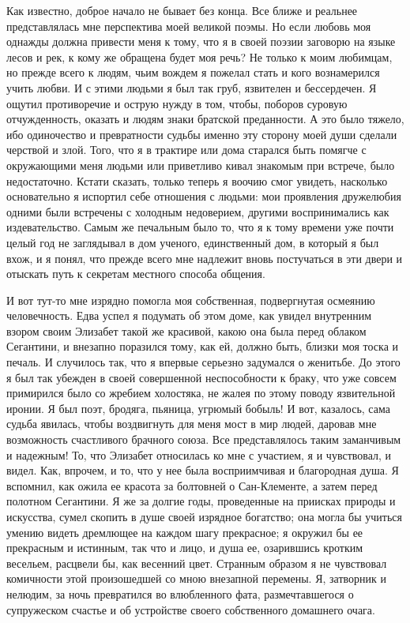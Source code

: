 Как известно, доброе начало не бывает  без конца. Все ближе и реальнее
представлялась мне перспектива моей великой  поэмы. Но если любовь моя
однажды должна привести меня к тому,  что я в своей поэзии заговорю на
языке лесов и рек, к кому же обращена будет моя речь? Не только к моим
любимцам,  но прежде  всего к  людям, чьим  вождем я  пожелал стать  и
кого  вознамерился учить  любви.  И с  этими людьми  я  был так  груб,
язвителен и бессердечен.  Я ощутил противоречие и острую  нужду в том,
чтобы, поборов  суровую отчужденность, оказать и  людям знаки братской
преданности. А это было тяжело,  ибо одиночество и превратности судьбы
именно эту  сторону моей души сделали  черствой и злой. Того,  что я в
трактире или дома старался быть  помягче с окружающими меня людьми или
приветливо  кивал  знакомым  при встрече,  было  недостаточно.  Кстати
сказать, только теперь я воочию смог увидеть, насколько основательно я
испортил  себе отношения  с людьми:  мои проявления  дружелюбия одними
были  встречены  с  холодным недоверием,  другими  воспринимались  как
издевательство. Самым же  печальным было то, что я к  тому времени уже
почти  целый год  не заглядывал  в  дом ученого,  единственный дом,  в
который я  был вхож, и  я понял, что  прежде всего мне  надлежит вновь
постучаться в  эти двери и  отыскать путь к секретам  местного способа
общения.

И  вот  тут-то  мне  изрядно  помогла  моя  собственная,  подвергнутая
осмеянию человечность. Едва успел я  подумать об этом доме, как увидел
внутренним взором  своим Элизабет  такой же  красивой, какою  она была
перед облаком  Сегантини, и  внезапно поразился  тому, как  ей, должно
быть,  близки моя  тоска  и печаль.  И случилось  так,  что я  впервые
серьезно задумался  о женитьбе.  До этого  я был  так убежден  в своей
совершенной неспособности к  браку, что уже совсем  примирился было со
жребием холостяка, не жалея по  этому поводу язвительной иронии. Я был
поэт, бродяга, пьяница,  угрюмый бобыль! И вот,  казалось, сама судьба
явилась,  чтобы воздвигнуть  для меня  мост в  мир людей,  даровав мне
возможность  счастливого  брачного  союза.  Все  представлялось  таким
заманчивым и надежным! То, что  Элизабет относилась ко мне с участием,
я  и  чувствовал,  и  видел.  Как,  впрочем, и  то,  что  у  нее  была
восприимчивая и благородная душа. Я  вспомнил, как ожила ее красота за
болтовней о  Сан-Клементе, а затем  перед полотном Сегантини. Я  же за
долгие  годы,  проведенные  на  приисках природы  и  искусства,  сумел
скопить в душе  своей изрядное богатство; она могла  бы учиться умению
видеть дремлющее на каждом шагу прекрасное; я окружил бы ее прекрасным
и истинным,  так что и лицо,  и душа ее, озарившись  кротким весельем,
расцвели  бы, как  весенний  цвет. Странным  образом  я не  чувствовал
комичности этой произошедшей со  мною внезапной перемены. Я, затворник
и нелюдим, за ночь превратился  во влюбленного фата, размечтавшегося о
супружеском  счастье и  об  устройстве  своего собственного  домашнего
очага.

